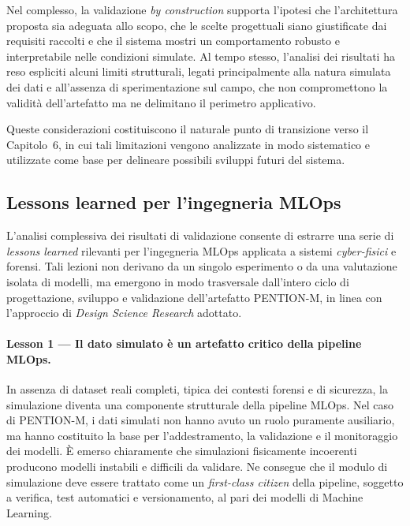 Nel complesso, la validazione \textit{by construction} supporta l’ipotesi che l’architettura proposta sia adeguata allo scopo, che le scelte progettuali siano giustificate dai requisiti raccolti e che il sistema mostri un comportamento robusto e interpretabile nelle condizioni simulate. Al tempo stesso, l’analisi dei risultati ha reso espliciti alcuni limiti strutturali, legati principalmente alla natura simulata dei dati e all’assenza di sperimentazione sul campo, che non compromettono la validità dell’artefatto ma ne delimitano il perimetro applicativo.

Queste considerazioni costituiscono il naturale punto di transizione verso il Capitolo~6, in cui tali limitazioni vengono analizzate in modo sistematico e utilizzate come base per delineare possibili sviluppi futuri del sistema.

\subsection{Lessons learned per l’ingegneria MLOps}
\label{sec:lessons_learned_mlops}

L’analisi complessiva dei risultati di validazione consente di estrarre una serie di \emph{lessons learned} rilevanti per l’ingegneria MLOps applicata a sistemi \textit{cyber-fisici} e forensi.
Tali lezioni non derivano da un singolo esperimento o da una valutazione isolata di modelli, ma emergono in modo trasversale dall’intero ciclo di progettazione, sviluppo e validazione dell’artefatto \textsc{PENTION-M}, in linea con l’approccio di \emph{Design Science Research} adottato.

\paragraph{Lesson 1 — Il dato simulato è un artefatto critico della pipeline MLOps.}
In assenza di dataset reali completi, tipica dei contesti forensi e di sicurezza, la simulazione diventa una componente strutturale della pipeline MLOps.
Nel caso di \textsc{PENTION-M}, i dati simulati non hanno avuto un ruolo puramente ausiliario, ma hanno costituito la base per l’addestramento, la validazione e il monitoraggio dei modelli.
È emerso chiaramente che simulazioni fisicamente incoerenti producono modelli instabili e difficili da validare.
Ne consegue che il modulo di simulazione deve essere trattato come un \emph{first-class citizen} della pipeline, soggetto a verifica, test automatici e versionamento, al pari dei modelli di Machine Learning.

